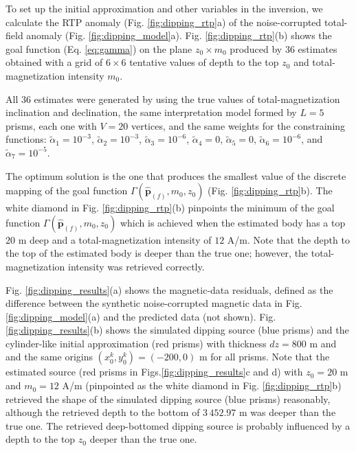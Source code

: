 To set up the initial approximation and other variables in the inversion, we calculate the RTP anomaly (Fig. \ref{fig:dipping_rtp}a) of the noise-corrupted total-field anomaly (Fig. \ref{fig:dipping_model}a).
Fig. \ref{fig:dipping_rtp}(b) shows the goal function (Eq. \ref{eq:gamma}) on the plane 
$z_0 \times m_0 $ produced by 36 estimates obtained with a grid of $6 \times 6$ tentative values of depth to the top $z_0$ and total-magnetization intensity $m_0$. 

All $ 36 $ estimates were generated by using the true values of total-magnetization inclination and declination, the same interpretation model formed by $ L = 5 $ prisms, 
each one with $ V = 20 $ vertices, and the same weights for the constraining functions: 
$\tilde{\alpha}_1 = 10^{-3}$, 
$\tilde{\alpha}_2 = 10^{-3}$, 
$\tilde{\alpha}_3 = 10^{-6}$, 
$\tilde{\alpha}_4 = 0$, 
$\tilde{\alpha}_5 = 0$, 
$\tilde{\alpha}_6 = 10^{-6}$, and 
$\tilde{\alpha}_7 = 10^{-5}$. 


The optimum solution is the one that produces the smallest value of the discrete mapping 
of the goal function $\Gamma (\hat{\mathbf{p}}_{(f)}, m_{0}, z_{0})$ (Fig.
\ref{fig:dipping_rtp}b). 
The white diamond in Fig. \ref{fig:dipping_rtp}(b) pinpoints the minimum of the goal function $\Gamma (\hat{\mathbf{p}}_{(f)}, m_{0}, z_{0})$ which is achieved when the estimated body has a top $ 20 $ m deep and a total-magnetization intensity of $ 12 $ A/m. 
Note that the depth to the top of the estimated body is deeper than the true one; 
however, the total-magnetization intensity was retrieved correctly.

Fig. \ref{fig:dipping_results}(a) shows the magnetic-data residuals, defined as the difference
between the synthetic noise-corrupted magnetic data in Fig. \ref{fig:dipping_model}(a) 
and the predicted data (not shown).
Fig. \ref{fig:dipping_results}(b) shows the simulated dipping source (blue prisms) and 
the cylinder-like initial approximation (red prisms) with thickness $ dz = 800 $ m and 
and the same origins $(x^k_0, y^k_0) = (-200, 0) $ m for all prisms.
Note that the estimated source (red prisms in Figs.\ref{fig:dipping_results}c and d)
with $z_0 = 20$ m and $m_0 = 12$ A/m 
(pinpointed as the white diamond in Fig. \ref{fig:dipping_rtp}b)
retrieved the shape of the simulated dipping source (blue prisms) reasonably, although
the retrieved depth to the bottom of $ 3\,452.97 $ m was deeper than the true one.
The retrieved deep-bottomed dipping source is probably influenced by a depth to the top $ z_0 $ deeper than the true one.


